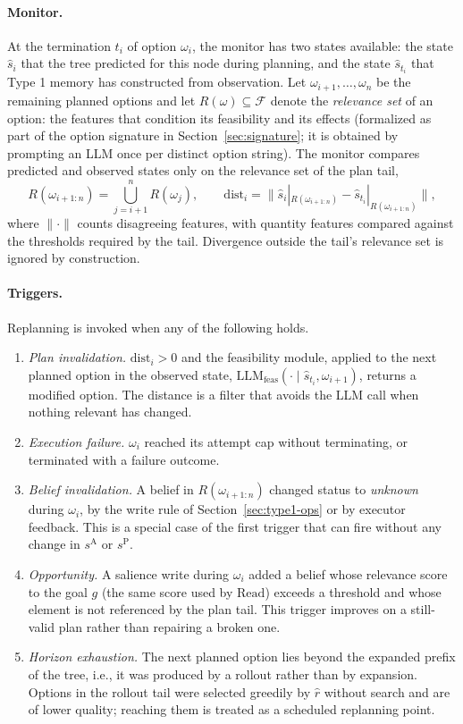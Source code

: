 \documentclass[11pt]{article}
\newcommand{\llm}[1]{\mathrm{LLM}_{\mathrm{#1}}}
\newcommand{\calF}{\mathcal{F}}
\newcommand{\Rel}{R}
\newcommand{\shat}{\hat{s}}
\newcommand{\sA}{s^{\mathrm{A}}}
\newcommand{\sP}{s^{\mathrm{P}}}
\newcommand{\Read}{\mathrm{Read}}
\newcommand{\dist}{\mathrm{dist}}
\begin{document}
\paragraph{Monitor.}
At the termination $t_i$ of option $\omega_i$, the monitor has two states available: the state $\shat_i$ that the tree predicted for this node during planning, and the state $\shat_{t_i}$ that Type 1 memory has constructed from observation. Let $\omega_{i+1},\dots,\omega_n$ be the remaining planned options and let $\Rel(\omega)\subseteq\calF$ denote the \emph{relevance set} of an option: the features that condition its feasibility and its effects (formalized as part of the option signature in Section~\ref{sec:signature}; it is obtained by prompting an LLM once per distinct option string). The monitor compares predicted and observed states only on the relevance set of the plan tail,
\begin{equation}
\Rel(\omega_{i+1:n})=\textstyle\bigcup_{j=i+1}^{n}\Rel(\omega_j),\qquad
\dist_i=\big\|\shat_i|_{\Rel(\omega_{i+1:n})}-\shat_{t_i}|_{\Rel(\omega_{i+1:n})}\big\|,
\label{eq:monitor}
\end{equation}
where $\|\cdot\|$ counts disagreeing features, with quantity features compared against the thresholds required by the tail. Divergence outside the tail's relevance set is ignored by construction.

\paragraph{Triggers.}
Replanning is invoked when any of the following holds.
\begin{enumerate}[leftmargin=1.5em,itemsep=1pt]
\item \emph{Plan invalidation.} $\dist_i>0$ and the feasibility module, applied to the next planned option in the observed state, $\llm{feas}(\cdot\mid\shat_{t_i},\omega_{i+1})$, returns a modified option. The distance is a filter that avoids the LLM call when nothing relevant has changed.
\item \emph{Execution failure.} $\omega_i$ reached its attempt cap without terminating, or terminated with a failure outcome.
\item \emph{Belief invalidation.} A belief in $\Rel(\omega_{i+1:n})$ changed status to \emph{unknown} during $\omega_i$, by the write rule of Section~\ref{sec:type1-ops} or by executor feedback. This is a special case of the first trigger that can fire without any change in $\sA$ or $\sP$.
\item \emph{Opportunity.} A salience write during $\omega_i$ added a belief whose relevance score to the goal $g$ (the same score used by $\Read$) exceeds a threshold and whose element is not referenced by the plan tail. This trigger improves on a still-valid plan rather than repairing a broken one.
\item \emph{Horizon exhaustion.} The next planned option lies beyond the expanded prefix of the tree, i.e., it was produced by a rollout rather than by expansion. Options in the rollout tail were selected greedily by $\hat r$ without search and are of lower quality; reaching them is treated as a scheduled replanning point.
\end{enumerate}
\end{document}
